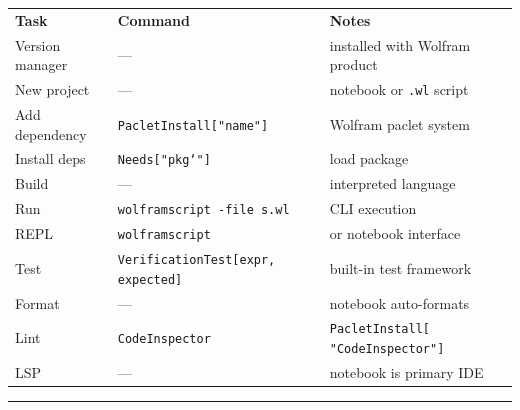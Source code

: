 \documentclass[10pt]{extarticle}
\begin{document}
\small


\begin{tabularx}{\linewidth}{@{}l@{\quad}l@{\quad}Y@{}}
\textbf{Task}        & \textbf{Command}                                  & \textbf{Notes} \\[2pt]
Version manager      & ---                                                & installed with Wolfram product \\
New project          & ---                                                & notebook or \texttt{.wl} script \\
Add dependency       & \texttt{PacletInstall["name"]}                    & Wolfram paclet system \\
Install deps         & \texttt{Needs["pkg`"]}                            & load package \\
Build                & ---                                                & interpreted language \\
Run                  & \texttt{wolframscript -file s.wl}                 & CLI execution \\
REPL                 & \texttt{wolframscript}                            & or notebook interface \\
Test                 & \texttt{VerificationTest[expr, expected]}         & built-in test framework \\
Format               & ---                                                & notebook auto-formats \\
Lint                 & \texttt{CodeInspector}                            & \texttt{PacletInstall[ "CodeInspector"]} \\
LSP                  & ---                                                & notebook is primary IDE \\
\end{tabularx}

\vspace{6pt}
\rule{\linewidth}{0.2pt}
\end{document}
